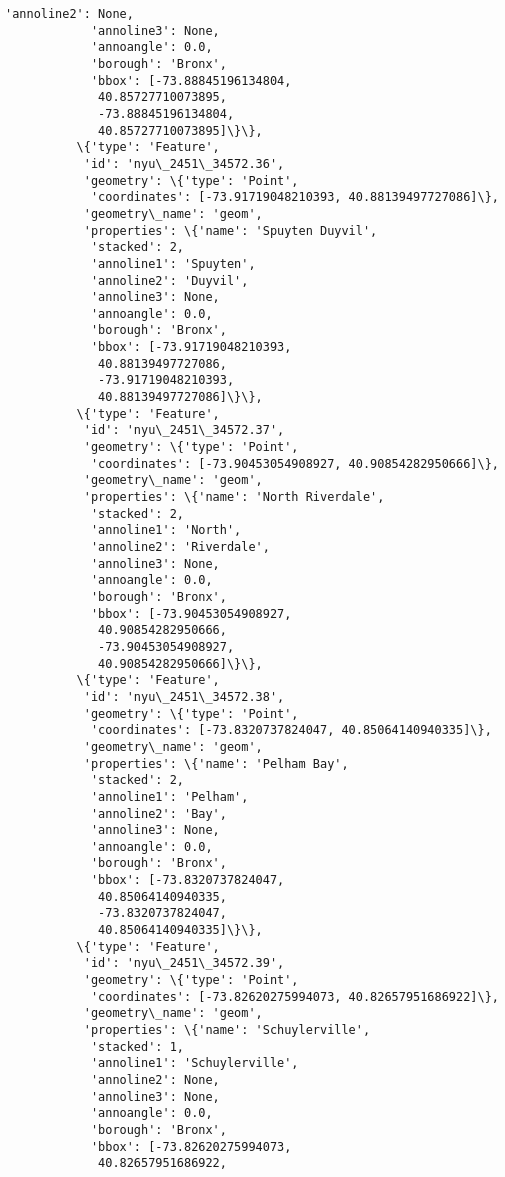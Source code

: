 \documentclass[11pt]{article}
\begin{document}
\begin{Verbatim}[commandchars=\\\{\}]
            'annoline2': None,
            'annoline3': None,
            'annoangle': 0.0,
            'borough': 'Bronx',
            'bbox': [-73.88845196134804,
             40.85727710073895,
             -73.88845196134804,
             40.85727710073895]\}\},
          \{'type': 'Feature',
           'id': 'nyu\_2451\_34572.36',
           'geometry': \{'type': 'Point',
            'coordinates': [-73.91719048210393, 40.88139497727086]\},
           'geometry\_name': 'geom',
           'properties': \{'name': 'Spuyten Duyvil',
            'stacked': 2,
            'annoline1': 'Spuyten',
            'annoline2': 'Duyvil',
            'annoline3': None,
            'annoangle': 0.0,
            'borough': 'Bronx',
            'bbox': [-73.91719048210393,
             40.88139497727086,
             -73.91719048210393,
             40.88139497727086]\}\},
          \{'type': 'Feature',
           'id': 'nyu\_2451\_34572.37',
           'geometry': \{'type': 'Point',
            'coordinates': [-73.90453054908927, 40.90854282950666]\},
           'geometry\_name': 'geom',
           'properties': \{'name': 'North Riverdale',
            'stacked': 2,
            'annoline1': 'North',
            'annoline2': 'Riverdale',
            'annoline3': None,
            'annoangle': 0.0,
            'borough': 'Bronx',
            'bbox': [-73.90453054908927,
             40.90854282950666,
             -73.90453054908927,
             40.90854282950666]\}\},
          \{'type': 'Feature',
           'id': 'nyu\_2451\_34572.38',
           'geometry': \{'type': 'Point',
            'coordinates': [-73.8320737824047, 40.85064140940335]\},
           'geometry\_name': 'geom',
           'properties': \{'name': 'Pelham Bay',
            'stacked': 2,
            'annoline1': 'Pelham',
            'annoline2': 'Bay',
            'annoline3': None,
            'annoangle': 0.0,
            'borough': 'Bronx',
            'bbox': [-73.8320737824047,
             40.85064140940335,
             -73.8320737824047,
             40.85064140940335]\}\},
          \{'type': 'Feature',
           'id': 'nyu\_2451\_34572.39',
           'geometry': \{'type': 'Point',
            'coordinates': [-73.82620275994073, 40.82657951686922]\},
           'geometry\_name': 'geom',
           'properties': \{'name': 'Schuylerville',
            'stacked': 1,
            'annoline1': 'Schuylerville',
            'annoline2': None,
            'annoline3': None,
            'annoangle': 0.0,
            'borough': 'Bronx',
            'bbox': [-73.82620275994073,
             40.82657951686922,

\end{Verbatim}
\end{document}
